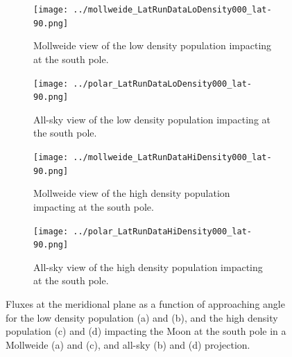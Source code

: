 \documentclass{article}
\begin{document}
\begin{figure}[!htb]
	\begin{subfigure}{.485\textwidth}
		\centering
		\texttt{[image: ../mollweide\_LatRunDataLoDensity000\_lat-90.png]}  
		\caption{Mollweide view of the low density population impacting at the south pole.}
		\label{fig:mollweide_LatRunDataLiDensity000_lat-90}
	\end{subfigure}
	\begin{subfigure}{.485\textwidth}
		\centering
		\texttt{[image: ../polar\_LatRunDataLoDensity000\_lat-90.png]}  
		\caption{All-sky view of the low density population impacting at the south pole.}
		\label{fig:polar_LatRunDataLoDensity000_lat-90}
	\end{subfigure}
	\newline
	\begin{subfigure}{.485\textwidth}
		\centering
		\texttt{[image: ../mollweide\_LatRunDataHiDensity000\_lat-90.png]}  
		\caption{Mollweide view of the high density population impacting at the south pole.}
		\label{fig:mollweide_LatRunDataHiDensity000_lat-90}
	\end{subfigure}
	\begin{subfigure}{.485\textwidth}
		\centering
		\texttt{[image: ../polar\_LatRunDataHiDensity000\_lat-90.png]}  
		\caption{All-sky view of the high density population impacting at the south pole.}
		\label{fig:polar_LatRunDataHiDensity000_lat-90}
	\end{subfigure}
	\caption{Fluxes at the meridional plane as a function of approaching angle for the low density population (a) and (b), and the high density population (c) and (d) impacting the Moon at the south pole in a Mollweide (a) and (c), and all-sky (b) and (d) projection.}
	\label{fig:MEM angular dist at poles}
\end{figure}
\end{document}
